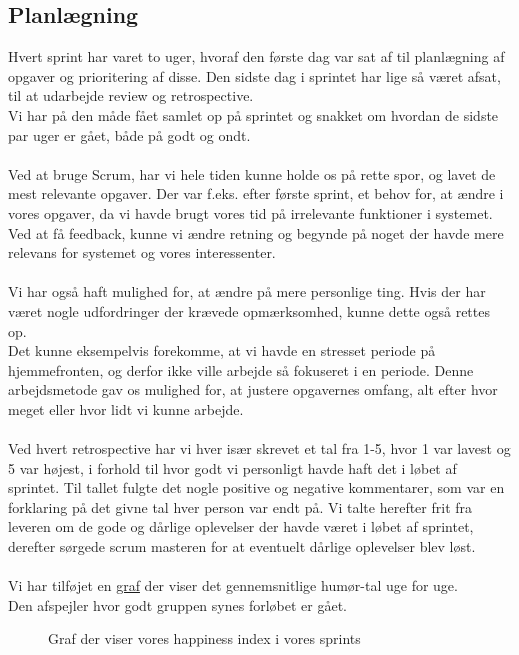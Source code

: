 \subsection{Planlægning}
Hvert sprint har varet to uger, hvoraf den første dag var sat af til planlægning af opgaver og prioritering af disse.
Den sidste dag i sprintet har lige så været afsat, til at udarbejde review og retrospective.
\\
Vi har på den måde fået samlet op på sprintet og snakket om hvordan de sidste par uger er gået, både på godt og ondt.
\\\\
Ved at bruge Scrum, har vi hele tiden kunne holde os på rette spor, og lavet de mest relevante opgaver.
Der var f.eks. efter første sprint, et behov for, at ændre i vores opgaver, da vi havde brugt vores tid på irrelevante funktioner i systemet.
Ved at få feedback, kunne vi ændre retning og begynde på noget der havde mere relevans for systemet og vores interessenter.
\\\\
Vi har også haft mulighed for, at ændre på mere personlige ting.
Hvis der har været nogle udfordringer der krævede opmærksomhed, kunne dette også rettes op.
\\
Det kunne eksempelvis forekomme, at vi havde en stresset periode på hjemmefronten, og derfor ikke ville arbejde så fokuseret i en periode.
Denne arbejdsmetode gav os mulighed for, at justere opgavernes omfang, alt efter hvor meget eller hvor lidt vi kunne arbejde.
\\\\
Ved hvert retrospective har vi hver især skrevet et tal fra 1-5, hvor 1 var lavest og 5 var højest, i forhold til hvor godt vi personligt havde haft det i løbet af sprintet.
Til tallet fulgte det nogle positive og negative kommentarer, som var en forklaring på det givne tal hver person var endt på.
Vi talte herefter frit fra leveren om de gode og dårlige oplevelser der havde været i løbet af sprintet, derefter sørgede scrum masteren for at
eventuelt dårlige oplevelser blev løst.
\\\\
Vi har tilføjet en \hyperref[fig:happi]{graf} der viser det gennemsnitlige humør-tal uge for uge.
\\
Den afspejler hvor godt gruppen synes forløbet er gået.
\begin{figure}[H]
    \caption{Graf der viser vores happiness index i vores sprints}
    \label{fig:happi}
\end{figure}
